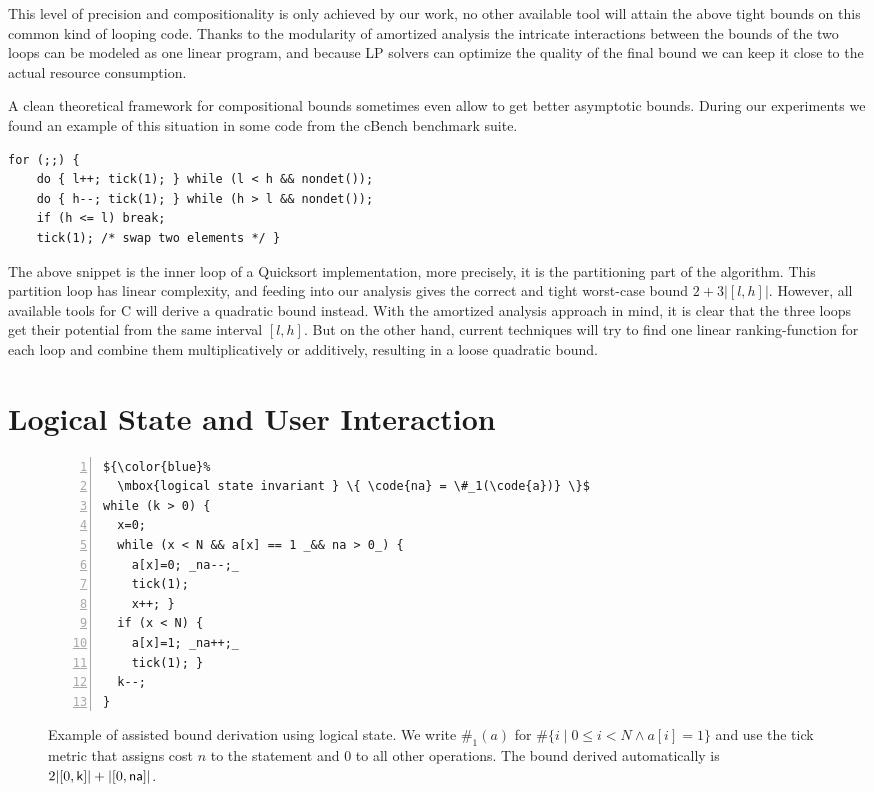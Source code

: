 \documentclass[nocopyrightspace,preprint]{sigplanconf}
\newcommand{\ifshort}[2]{\ifx\fullversion\undefined{#1}\else{#2}\fi}
\newcommand{\sectskip}[0]{\ifshort{\vspace{-3pt}}{}}
\newcommand{\aftersectskip}[0]{\ifshort{\vspace{-1pt}}{}}
\begin{document}
This level of precision and compositionality is only achieved by
our work, no other available tool will attain the above tight bounds
on this common kind of looping code.  Thanks to the modularity of
amortized analysis the intricate interactions between the bounds of
the two loops can be modeled as one linear program, and because LP
solvers can optimize the quality of the final bound we can keep
it close to the actual resource consumption.

A clean theoretical framework for compositional bounds sometimes
even allow to get better asymptotic bounds.  During our experiments
we found an example of this situation in some code from the cBench
benchmark suite.
%
\begin{lstlisting}
for (;;) {
    do { l++; tick(1); } while (l < h && nondet());
    do { h--; tick(1); } while (h > l && nondet());
    if (h <= l) break;
    tick(1); /* swap two elements */ }
\end{lstlisting}
%
The above snippet is the inner loop of a Quicksort implementation, more
precisely, it is the partitioning part of the algorithm.  This partition
loop has linear complexity, and feeding into our analysis gives the
correct and tight worst-case bound $2+3|[l,h]|$.  However, all available
tools for C will derive a quadratic bound instead.  With the amortized
analysis approach in mind, it is clear that the three loops get their
potential from the same interval $[l,h]$.  But on the other hand, current
techniques will try to find one linear ranking-function for each loop
and combine them multiplicatively or additively, resulting in a loose
quadratic bound.
%

\sectskip
\section{Logical State and User Interaction}
\label{sec:anno}
\aftersectskip

\begin{figure}
\center
\begin{minipage}[b]{0.8\linewidth}
\begin{lstlisting}[numbers=left]
${\color{blue}%
  \mbox{logical state invariant } \{ \code{na} = \#_1(\code{a})} \}$
while (k > 0) {
  x=0;
  while (x < N && a[x] == 1 _&& na > 0_) {
    a[x]=0; _na--;_
    tick(1);
    x++; }
  if (x < N) {
    a[x]=1; _na++;_
    tick(1); }
  k--;
}
\end{lstlisting}
\end{minipage}
\caption{Example of assisted bound derivation using logical state.  We write
  $\#_1(a)$ for $\# \{ i \mid 0 \le i < N \land a[i] = 1 \}$ and use the
  tick metric that assigns cost $n$ to the statement  and
  0 to all other operations.  The bound derived automatically is
  $2|[0,\mathsf{k}]| + |[0,\mathsf{na}]|$.
  }
\label{fig:xmplincaux}
\end{figure}
\end{document}
